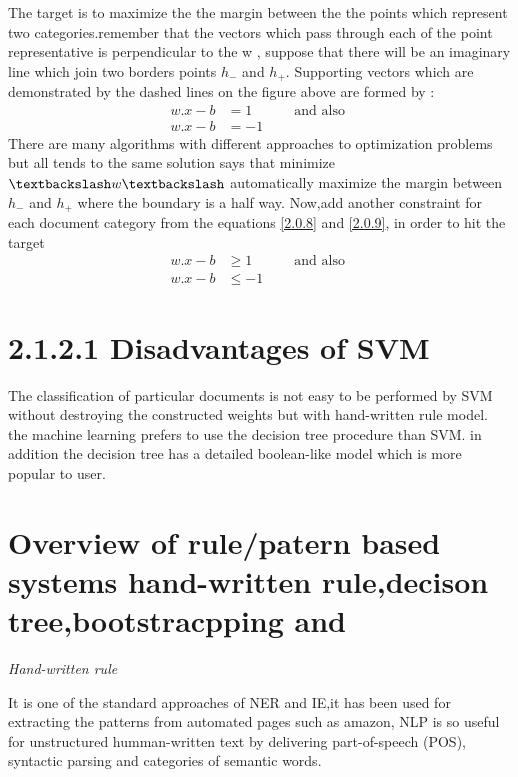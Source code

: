 The target is to maximize the the margin between the the points which represent two categories.remember that the vectors which pass through each of the point representative is perpendicular to the w , suppose that there will be an imaginary line which join two borders points $ h_{-}$ and $ h_{+}$.
Supporting vectors which are demonstrated by the dashed lines on the figure above  are formed by :
\begin{align}
w.x- b & = 1 \label{2.0.8} \quad \quad \quad  \text{and also } \\
w.x- b & = -1 \label{2.0.9}
\end{align}
There are many algorithms with different approaches to optimization problems but all tends to the same solution says that minimize $\textbackslash w \textbackslash$ automatically maximize the margin between $ h_{-}$ and $ h_{+}$ where the boundary is a half way.
Now,add another constraint for each document category from the equations \eqref{2.0.8} and \eqref{2.0.9}, in order to hit the target
\begin{align}
w.x- b & \geq     1 \label{2.0.8} \quad \quad \quad  \text{and also } \\
w.x- b & \leq -1 \label{2.0.9}
\end{align}


\section*{2.1.2.1 Disadvantages of SVM} 

The classification of particular documents is not easy to be performed by SVM without destroying the constructed weights  but with hand-written rule model. the machine learning prefers to use the decision tree procedure than SVM. in addition the decision tree has a detailed boolean-like  model which is more popular to user.

\section*{Overview of rule/patern based systems hand-written rule,decison tree,bootstracpping and  }

\textit{Hand-written rule}

It is one of the standard approaches of NER and IE,it has been used for extracting the patterns from automated pages such as amazon, NLP is so useful for unstructured humman-written text by delivering  part-of-speech (POS), syntactic parsing and categories of semantic words.

